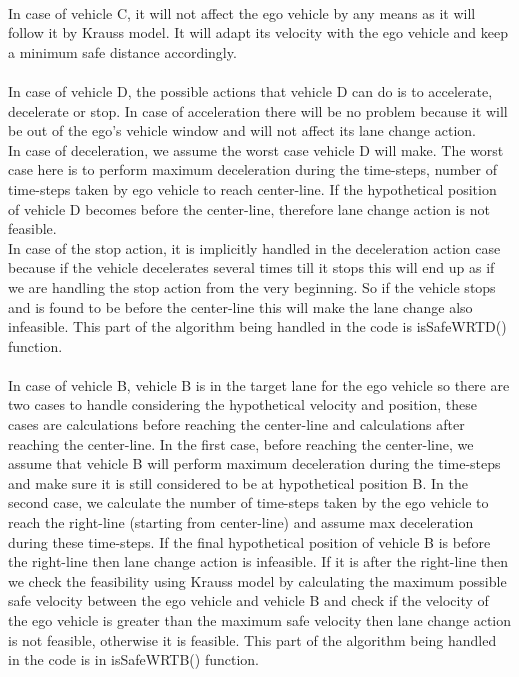 \\ 
In case of vehicle C, it will not affect the ego vehicle by any means as it will follow it by Krauss model. It will adapt its velocity with the ego vehicle and keep a minimum safe distance accordingly. \\
\\ 
In case of vehicle D, the possible actions that vehicle D can do is to accelerate, decelerate or stop. In case of acceleration there will be no problem because it will be out of the ego’s vehicle window and will not affect its lane change action. \\
In case of deceleration, we assume the worst case vehicle D will make. The worst case here is to perform maximum deceleration during the time-steps, number of time-steps taken by ego vehicle to reach center-line. If the hypothetical position of vehicle D becomes before the center-line, therefore lane change action is not feasible. \\
In case of the stop action, it is implicitly handled in the deceleration action case because if the vehicle decelerates several times till it stops this will end up as if we are handling the stop action from the very beginning. So if the vehicle stops and is found to be before the center-line this will make the lane change also infeasible. This part of the algorithm being handled in the code is isSafeWRTD() function.\\
\\
In case of vehicle B, vehicle B is in the target lane for the ego vehicle so there are two cases to handle considering the hypothetical velocity and position, these cases are calculations before reaching the center-line and calculations after reaching the center-line. In the first case, before reaching the center-line, we assume that vehicle B will perform maximum deceleration during the time-steps and make sure it is still considered to be at hypothetical position B. In the second case, we calculate the number of time-steps taken by the ego vehicle to reach the right-line (starting from center-line) and assume max deceleration during these time-steps. If the final hypothetical position of vehicle B is before the right-line then lane change action is infeasible. If it is after the right-line then we check the feasibility using Krauss model by calculating the maximum possible safe velocity between the ego vehicle and vehicle B and check if the velocity of the ego vehicle is greater than the maximum safe velocity then lane change action is not feasible, otherwise it is feasible. This part of the algorithm being handled in the code is in isSafeWRTB() function. \\
